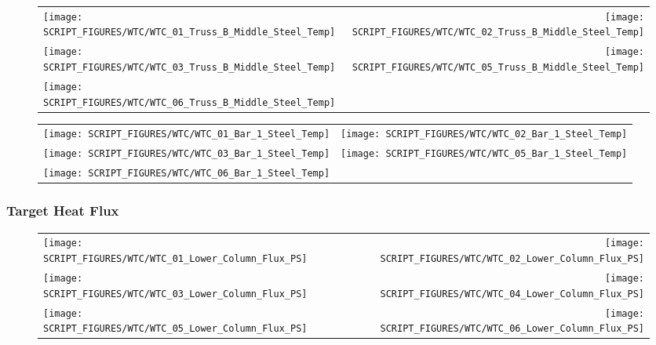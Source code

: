 \begin{figure}[!ht]
\begin{tabular*}{\textwidth}{l@{\extracolsep{\fill}}r}
\texttt{[image: SCRIPT\_FIGURES/WTC/WTC\_01\_Truss\_B\_Middle\_Steel\_Temp]} &
\texttt{[image: SCRIPT\_FIGURES/WTC/WTC\_02\_Truss\_B\_Middle\_Steel\_Temp]} \\
\texttt{[image: SCRIPT\_FIGURES/WTC/WTC\_03\_Truss\_B\_Middle\_Steel\_Temp]} &
\texttt{[image: SCRIPT\_FIGURES/WTC/WTC\_05\_Truss\_B\_Middle\_Steel\_Temp]} \\
\texttt{[image: SCRIPT\_FIGURES/WTC/WTC\_06\_Truss\_B\_Middle\_Steel\_Temp]}
\end{tabular*}
\end{figure}

\begin{figure}[!ht]
\begin{tabular*}{\textwidth}{l@{\extracolsep{\fill}}r}
\texttt{[image: SCRIPT\_FIGURES/WTC/WTC\_01\_Bar\_1\_Steel\_Temp]} &
\texttt{[image: SCRIPT\_FIGURES/WTC/WTC\_02\_Bar\_1\_Steel\_Temp]} \\
\texttt{[image: SCRIPT\_FIGURES/WTC/WTC\_03\_Bar\_1\_Steel\_Temp]} &
\texttt{[image: SCRIPT\_FIGURES/WTC/WTC\_05\_Bar\_1\_Steel\_Temp]} \\
\texttt{[image: SCRIPT\_FIGURES/WTC/WTC\_06\_Bar\_1\_Steel\_Temp]}
\end{tabular*}
\end{figure}

\clearpage

\subsubsection{Target Heat Flux}

\begin{figure}[!ht]
\begin{tabular*}{\textwidth}{l@{\extracolsep{\fill}}r}
\texttt{[image: SCRIPT\_FIGURES/WTC/WTC\_01\_Lower\_Column\_Flux\_PS]} &
\texttt{[image: SCRIPT\_FIGURES/WTC/WTC\_02\_Lower\_Column\_Flux\_PS]} \\
\texttt{[image: SCRIPT\_FIGURES/WTC/WTC\_03\_Lower\_Column\_Flux\_PS]} &
\texttt{[image: SCRIPT\_FIGURES/WTC/WTC\_04\_Lower\_Column\_Flux\_PS]} \\
\texttt{[image: SCRIPT\_FIGURES/WTC/WTC\_05\_Lower\_Column\_Flux\_PS]} &
\texttt{[image: SCRIPT\_FIGURES/WTC/WTC\_06\_Lower\_Column\_Flux\_PS]}
\end{tabular*}
\end{figure}

